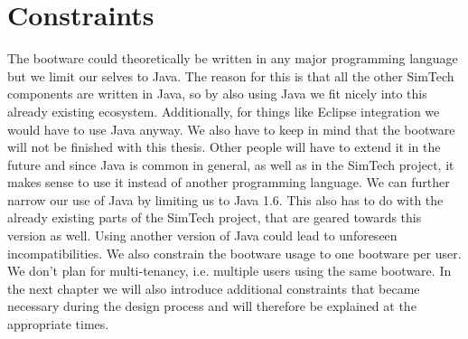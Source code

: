 \section{Constraints}

The bootware could theoretically be written in any major programming language but we limit our selves to Java.
The reason for this is that all the other SimTech components are written in Java, so by also using Java we fit nicely into this already existing ecosystem.
Additionally, for things like Eclipse integration we would have to use Java anyway.
We also have to keep in mind that the bootware will not be finished with this thesis.
Other people will have to extend it in the future and since Java is common in general, as well as in the SimTech project, it makes sense to use it instead of another programming language.
We can further narrow our use of Java by limiting us to Java 1.6.
This also has to do with the already existing parts of the SimTech project, that are geared towards this version as well.
Using another version of Java could lead to unforeseen incompatibilities.
We also constrain the bootware usage to one bootware per user.
We don't plan for multi-tenancy, i.e. multiple users using the same bootware.
In the next chapter we will also introduce additional constraints that became necessary during the design process and will therefore be explained at the appropriate times.
